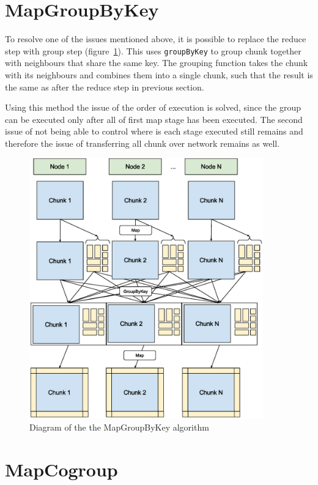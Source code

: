\documentclass{l4proj}
\begin{document}
\section{MapGroupByKey}

To resolve one of the issues mentioned above, it is possible to replace the reduce
step with group step (figure~\ref{fig:map_group}). This uses \texttt{groupByKey} to group chunk together with
neighbours that share the same key. The grouping function takes the chunk with
its neighbours and combines them into a single chunk, such that the result is the
same as after the reduce step in previous section.

Using this method the issue of the order of execution is solved, since the group
can be executed only after all of first map stage has been executed. The second issue
of not being able to control where is each stage executed still remains and therefore
the issue of transferring all chunk over network remains as well.

\begin{figure}
\centering
\includegraphics[width=0.9\textwidth]{images/MapGroup.eps}
\caption{Diagram of the the MapGroupByKey algorithm}
\label{fig:map_group}
\end{figure}

\section{MapCogroup}
\end{document}
